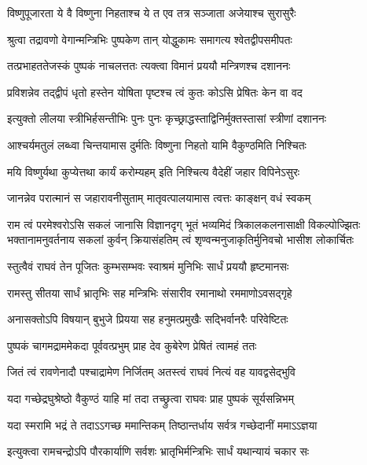 \twolineshloka
{विष्णुपूजारता ये वै विष्णुना निहताश्च ये}
{त एव तत्र सञ्जाता अजेयाश्च सुरासुरैः} %

\twolineshloka
{श्रुत्वा तद्रावणो वेगान्मन्त्रिभिः पुष्पकेण तान्}
{योद्धुकामः समागत्य श्वेतद्वीपसमीपतः} %

\twolineshloka
{तत्प्रभाहततेजस्कं पुष्पकं नाचलत्ततः}
{त्यक्त्वा विमानं प्रययौ मन्त्रिणश्च दशाननः} %

\twolineshloka
{प्रविशन्नेव तद्द्वीपं धृतो हस्तेन योषिता}
{पृष्टश्च त्वं कुतः कोऽसि प्रेषितः केन वा वद} %

\twolineshloka
{इत्युक्तो लीलया स्त्रीभिर्हसन्तीभिः पुनः पुनः}
{कृच्छ्राद्धस्ताद्विनिर्मुक्तस्तासां स्त्रीणां दशाननः} %

\twolineshloka
{आश्चर्यमतुलं लब्ध्वा चिन्तयामास दुर्मतिः}
{विष्णुना निहतो यामि वैकुण्ठमिति निश्चितः} %

\twolineshloka
{मयि विष्णुर्यथा कुप्येत्तथा कार्यं करोम्यहम्}
{इति निश्चित्य वैदेहीं जहार विपिनेऽसुरः} %

\twolineshloka
{जानन्नेव परात्मानं स जहारावनीसुताम्}
{मातृवत्पालयामास त्वत्तः काङ्क्षन् वधं स्वकम्} %

\fourlineindentedshloka
{राम त्वं परमेश्वरोऽसि सकलं जानासि विज्ञानदृग्}
{भूतं भव्यमिदं त्रिकालकलनासाक्षी विकल्पोज्झितः}
{भक्तानामनुवर्तनाय सकलां कुर्वन् क्रियासंहतिम्}
{त्वं शृण्वन्मनुजाकृतिर्मुनिवचो भासीश लोकार्चितः} %

\twolineshloka
{स्तुत्वैवं राघवं तेन पूजितः कुम्भसम्भवः}
{स्वाश्रमं मुनिभिः सार्धं प्रययौ हृष्टमानसः} %

\twolineshloka
{रामस्तु सीतया सार्धं भ्रातृभिः सह मन्त्रिभिः}
{संसारीव रमानाथो रममाणोऽवसद्गृहे} %

\twolineshloka
{अनासक्तोऽपि विषयान् बुभुजे प्रियया सह}
{हनुमत्प्रमुखैः सद्भिर्वानरैः परिवेष्टितः} %

\twolineshloka
{पुष्पकं चागमद्राममेकदा पूर्ववत्प्रभुम्}
{प्राह देव कुबेरेण प्रेषितं त्वामहं ततः} %

\twolineshloka
{जितं त्वं रावणेनादौ पश्चाद्रामेण निर्जितम्}
{अतस्त्वं राघवं नित्यं वह यावद्वसेद्भुवि} %

\twolineshloka
{यदा गच्छेद्रघुश्रेष्ठो वैकुण्ठं याहि मां तदा}
{तच्छ्रुत्वा राघवः प्राह पुष्पकं सूर्यसन्निभम्} %

\twolineshloka
{यदा स्मरामि भद्रं ते तदाऽऽगच्छ ममान्तिकम्}
{तिष्ठान्तर्धाय सर्वत्र गच्छेदानीं ममाऽऽज्ञया} %

\twolineshloka
{इत्युक्त्वा रामचन्द्रोऽपि पौरकार्याणि सर्वशः}
{भ्रातृभिर्मन्त्रिभिः सार्धं यथान्यायं चकार सः} %


